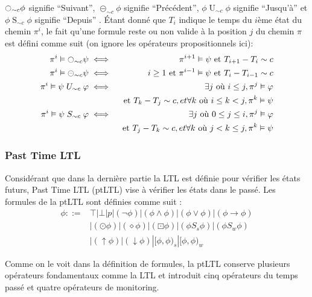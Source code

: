 $\fullmoon_{\sim{}c}\phi$ signifie ``Suivant'', $\circleddash_{\sim{}c}\phi$ signifie ``Précédent'', $\phi \mathrel{U}_{\sim{}c} \phi$ signifie ``Jusqu'à'' et $\phi \mathrel{S}_{\sim{}c} \phi$ signifie ``Depuis'' \citep{chang1994compositional}. Étant donné que $T_i$ indique le temps du $i$ème état du chemin $\pi^i$, le fait qu'une formule reste ou non valide à la position $j$ du chemin $\pi$ est défini comme suit (on ignore les opérateurs propositionnels ici):
\begin{eqnarray*}
\pi^i \vDash \fullmoon_{\sim{}c}\psi & \iff & \pi^{i+1} \vDash \psi \mbox{ et } T_{i+1} - T_i \sim c \\
\pi^i \vDash \circleddash_{\sim{}c}\psi & \iff & i \geq 1 \mbox{ et } \pi^{i-1} \vDash \psi \mbox{ et } T_i - T_{i-1} \sim c \\
\pi^i \vDash \psi \mathrel{U}_{\sim{}c} \varphi & \iff & \exists j \mbox{ où } i \leq j, \pi^j \vDash \varphi \\ & & \mbox{ et } T_k - T_j \sim c, et \forall k \mbox{ où } i \leq k < j, \pi^k \vDash \psi \\
\pi^i \vDash \psi \mathrel{S}_{\sim{}c} \varphi & \iff & \exists j \mbox{ où } 0 \leq j \leq i, \pi^j \vDash \varphi \\ & & \mbox{ et } T_j - T_k \sim c, et \forall k \mbox{ où } j < k \leq j, \pi^k \vDash \psi \\
\end{eqnarray*}

\subsubsection{Past Time LTL}

Considérant que dans la dernière partie la LTL est définie pour vérifier les états futurs, Past Time LTL (ptLTL) vise à vérifier les états dans le passé. Les formules de la ptLTL sont définies comme suit \citep{havelund2004efficient}:
\begin{align*}
\phi ::= & \top | \bot | p | (\neg\phi) | (\phi \wedge \phi) | (\phi \vee \phi) | (\phi \rightarrow \phi) \\
& | (\odot \phi) | (\diamond \phi) | (\boxdot \phi) | (\phi \mathrel{S_s} \phi) | (\phi \mathrel{S_w} \phi) \\
& | (\uparrow \phi) | (\downarrow \phi) | [\phi, \phi)_s | [\phi, \phi)_w
\end{align*}

Comme on le voit dans la définition de formules, la ptLTL conserve plusieurs opérateurs fondamentaux comme la LTL et introduit cinq opérateurs du temps passé et quatre opérateurs de monitoring.

